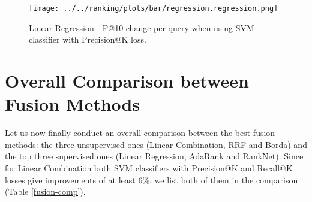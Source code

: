 \begin{table}[h!]
\centering
\caption{Absolute P@10 percent improvements per intent type for each of the four query runs
(Summaries 2014, Descriptions 2014, Summaries 2015, Descriptions 2015), when using weighted \textbf{Linear Regression}
for fusing the baseline relevance scores with the classifier scores.
The classifier is SVM with Precision@K loss.}
\label{change-per-query-table-regression}
\end{table}

\begin{figure}[h!]
\centerline{
  \texttt{[image: ../../ranking/plots/bar/regression.regression.png]}
  }
  \caption{Linear Regression - P@10 change per query when using SVM classifier with Precision@K loss.}
  \label{regression-query}
\end{figure}

\section{Overall Comparison between Fusion Methods}
Let us now finally conduct an overall comparison between the best fusion methods:
the three unsupervised ones (Linear Combination, RRF and Borda)
and the top three supervised ones (Linear Regression, AdaRank and RankNet).
Since for Linear Combination both SVM classifiers with Precision@K and Recall@K
losses give improvements of at least $6\%$, we list both of them in the comparison
(Table \ref{fusion-comp}).

